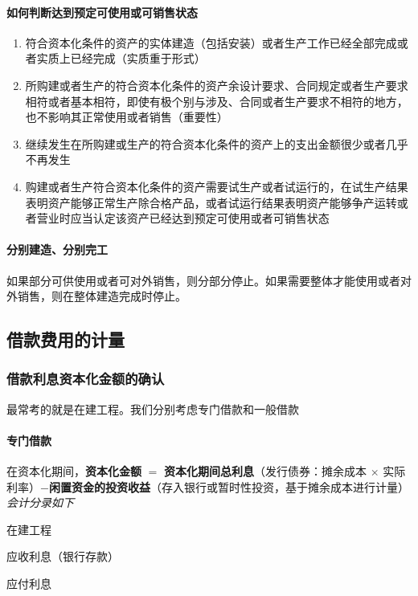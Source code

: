 \documentclass[UTF8,12pt]{ctexart}
\newenvironment{Dr}{%
	\begin{list}{}%
		{
			\setlength{\leftmargin}{2em}
			\setlength{\labelwidth}{2em}
			\setlength{\labelsep}{0pt}
			\setlength{\itemindent}{0pt}
			\setlength{\listparindent}{0pt}
			\setlength{\parsep}{0pt}
			\setlength{\topsep}{0pt}
		}
		\item[\textbf{借：}]
	}{%
	\end{list}
}
\newenvironment{Cr}{%
	\begin{list}{}%
		{
			\setlength{\leftmargin}{3em}
			\setlength{\labelwidth}{2em}
			\setlength{\labelsep}{0pt}
			\setlength{\itemindent}{0pt}
			\setlength{\listparindent}{0pt}
			\setlength{\parsep}{0pt}
			\setlength{\topsep}{0pt}
		}
		\item[\textbf{贷：}]
	}{%
	\end{list}
}
\numberwithin{equation}{section} %
\numberwithin{figure}{section}
\numberwithin{table}{section}
\begin{document}
	\paragraph{如何判断达到预定可使用或可销售状态}
	\begin{enumerate}
		\item 符合资本化条件的资产的实体建造（包括安装）或者生产工作已经全部完成或者实质上已经完成（实质重于形式）
		
		\item 所购建或者生产的符合资本化条件的资产余设计要求、合同规定或者生产要求相符或者基本相符，即使有极个别与涉及、合同或者生产要求不相符的地方，也不影响其正常使用或者销售（重要性）
		
		\item 继续发生在所购建或生产的符合资本化条件的资产上的支出金额很少或者几乎不再发生
		
		\item 购建或者生产符合资本化条件的资产需要试生产或者试运行的，在试生产结果表明资产能够正常生产除合格产品，或者试运行结果表明资产能够争产运转或者营业时应当认定该资产已经达到预定可使用或者可销售状态
	\end{enumerate}
	
	\paragraph{分别建造、分别完工}如果部分可供使用或者可对外销售，则分部分停止。如果需要整体才能使用或者对外销售，则在整体建造完成时停止。
	
	\subsection{借款费用的计量}
	
	\subsubsection{借款利息资本化金额的确认}
	最常考的就是在建工程。我们分别考虑专门借款和一般借款
	
	\paragraph{专门借款}
	在资本化期间，\textbf{资本化金额} $=$ \textbf{资本化期间总利息}（发行债券：摊余成本 $\times$ 实际利率）$-$\textbf{闲置资金的投资收益}（存入银行或暂时性投资，基于摊余成本进行计量）\textit{会计分录如下}
	
	\begin{Dr}
		在建工程
		
		应收利息（银行存款）
	\end{Dr}
	\begin{Cr}
		应付利息
	\end{Cr}
	
\end{document}
